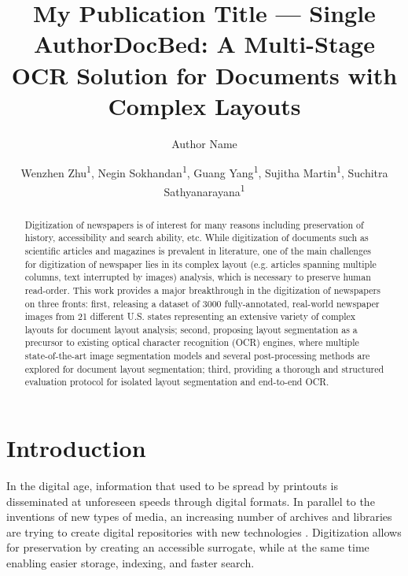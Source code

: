 \documentclass[letterpaper]{article} %
\title{My Publication Title --- Single Author}
\author {
    Author Name
}
\title{\title{DocBed: A Multi-Stage OCR Solution for Documents with Complex Layouts}}
\author {
    Wenzhen Zhu\textsuperscript{\rm 1},
    Negin Sokhandan\textsuperscript{\rm 1},
    Guang Yang\textsuperscript{\rm 1},
    Sujitha Martin\textsuperscript{\rm 1},
    Suchitra Sathyanarayana\textsuperscript{\rm 1}
}
\begin{document}
\maketitle

\begin{abstract}
Digitization of newspapers is of interest for many reasons including preservation of history, accessibility and search ability, etc. While digitization of documents such as scientific articles and magazines is prevalent in literature, one of the main challenges for digitization of newspaper lies in its complex layout (e.g. articles spanning multiple columns, text interrupted by images) analysis, which is necessary to preserve human read-order. This work provides a major breakthrough in the digitization of newspapers on three fronts: first, releasing a dataset of 3000 fully-annotated, real-world newspaper images from 21 different U.S. states representing an extensive variety of complex layouts for document layout analysis; second, proposing layout segmentation as a precursor to existing optical character recognition (OCR) engines, where multiple state-of-the-art image segmentation models and several post-processing methods are explored for document layout segmentation; third, providing a thorough and structured evaluation protocol for isolated layout segmentation and end-to-end OCR.

\end{abstract}

\section{Introduction}
In the digital age, information that used to be spread by printouts is disseminated at unforeseen speeds through digital formats. In parallel to the inventions of new types of media, an increasing number of archives and libraries are trying to create digital repositories with new technologies \cite{DBLP:journals/firstmonday/Cox07}. Digitization allows for preservation by creating an accessible surrogate, while at the same time enabling easier storage, indexing, and faster search.

\end{document}
